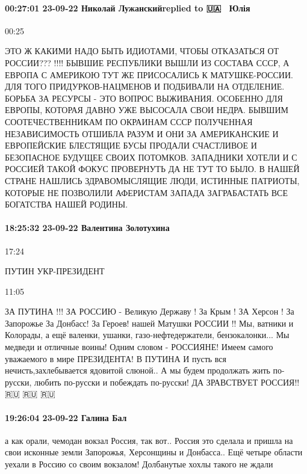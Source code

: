 \paragraph{00:27:01 23-09-22 Николай Лужанскийreplied to 🇺🇦💙💛 Юлія}
00:25

ЭТО
Ж КАКИМИ НАДО БЫТЬ ИДИОТАМИ, ЧТОБЫ
ОТКАЗАТЬСЯ ОТ РОССИИ??? !!!! БЫВШИЕ
РЕСПУБЛИКИ ВЫШЛИ ИЗ СОСТАВА СССР, А
ЕВРОПА С АМЕРИКОЮ ТУТ ЖЕ ПРИСОСАЛИСЬ К
МАТУШКЕ-РОССИИ. ДЛЯ ТОГО ПРИДУРКОВ-НАЦМЕНОВ
И ПОДБИВАЛИ НА ОТДЕЛЕНИЕ. БОРЬБА ЗА
РЕСУРСЫ - ЭТО ВОПРОС ВЫЖИВАНИЯ. ОСОБЕННО
ДЛЯ ЕВРОПЫ, КОТОРАЯ ДАВНО УЖЕ ВЫСОСАЛА
СВОИ НЕДРА. БЫВШИМ СООТЕЧЕСТВЕННИКАМ
ПО ОКРАИНАМ СССР ПОЛУЧЕННАЯ НЕЗАВИСИМОСТЬ
ОТШИБЛА РАЗУМ И ОНИ ЗА АМЕРИКАНСКИЕ И
ЕВРОПЕЙСКИЕ БЛЕСТЯЩИЕ БУСЫ ПРОДАЛИ
СЧАСТЛИВОЕ И БЕЗОПАСНОЕ БУДУЩЕЕ СВОИХ
ПОТОМКОВ. ЗАПАДНИКИ ХОТЕЛИ И С РОССИЕЙ
ТАКОЙ ФОКУС ПРОВЕРНУТЬ ДА НЕ ТУТ ТО
БЫЛО. В НАШЕЙ СТРАНЕ НАШЛИСЬ ЗДРАВОМЫСЛЯЩИЕ
ЛЮДИ, ИСТИННЫЕ ПАТРИОТЫ, КОТОРЫЕ НЕ
ПОЗВОЛИЛИ АФЕРИСТАМ ЗАПАДА ЗАГРАБАСТАТЬ
ВСЕ БОГАТСТВА НАШЕЙ РОДИНЫ.


\paragraph{18:25:32 23-09-22 Валентина Золотухина}
17:24

ПУТИН УКР-ПРЕЗИДЕНТ

11:05

ЗА ПУТИНА !!! ЗА РОССИЮ - Великую Державу ! За Крым ! ЗА Херсон ! За Запорожье За Донбасс! За Героев! нашей Матушки РОССИИ !! Мы, ватники и Колорады, а ещё валенки, ушанки, газо-нефтедержатели, бензокалонки... Мы медведи и отличные воины! Одним словом - РОССИЯНЕ!
Имеем самого уважаемого в мире ПРЕЗИДЕНТА! В ПУТИНА И пусть вся нечисть,захлебывается ядовитой слюной..
А мы будем продолжать жить по-русски,
любить по-русски и побеждать по-русски! ДА ЗРАВСТВУЕТ РОССИЯ!!🇷🇺 🇷🇺 🇷🇺 

\paragraph{19:26:04 23-09-22 Галина Бал}

а как орали, чемодан вокзал Россия, так вот.. Россия это сделала и пришла на
свои исконные земли Запорожья, Херсонщины и Донбасса.. Ещё четыре области
уехали в Россию со своим вокзалом! Долбанутые хохлы такого не ждали

